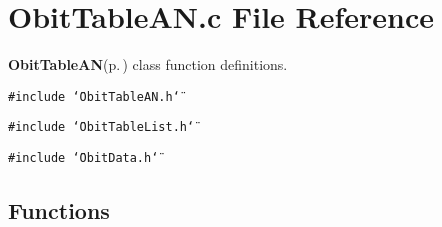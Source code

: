 \section{Obit\-Table\-AN.c File Reference}
\label{ObitTableAN_8c}
{\bf Obit\-Table\-AN}{\rm (p.\,\pageref{structObitTableAN})} class function definitions. 

{\tt \#include \char`\"{}Obit\-Table\-AN.h\char`\"{}}\par
{\tt \#include \char`\"{}Obit\-Table\-List.h\char`\"{}}\par
{\tt \#include \char`\"{}Obit\-Data.h\char`\"{}}\par
\subsection*{Functions}
